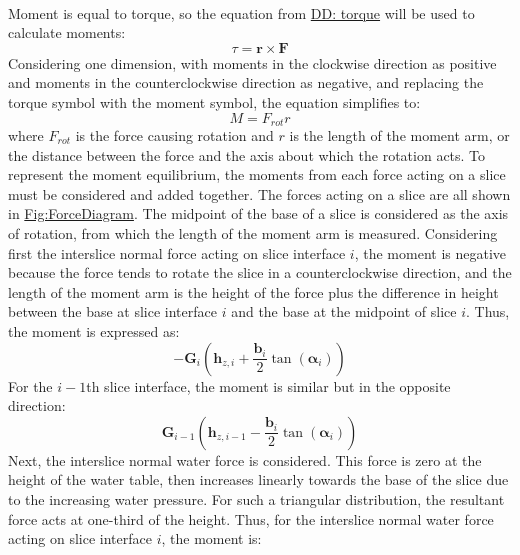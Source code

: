 \documentclass[12pt]{article}
\begin{document}
\paragraph{}
\label{GD:momentEqlDeriv}
Moment is equal to torque, so the equation from \hyperref[DD:torque]{DD: torque} will be used to calculate moments:
\begin{displaymath}
τ=\mathbf{r}\times\mathbf{F}
\end{displaymath}
Considering one dimension, with moments in the clockwise direction as positive and moments in the counterclockwise direction as negative, and replacing the torque symbol with the moment symbol, the equation simplifies to:
\begin{displaymath}
M={F_{rot}} r
\end{displaymath}
where ${F_{rot}}$ is the force causing rotation and $r$ is the length of the moment arm, or the distance between the force and the axis about which the rotation acts. To represent the moment equilibrium, the moments from each force acting on a slice must be considered and added together. The forces acting on a slice are all shown in \hyperref[Figure:ForceDiagram]{Fig:ForceDiagram}. The midpoint of the base of a slice is considered as the axis of rotation, from which the length of the moment arm is measured. Considering first the interslice normal force acting on slice interface $i$, the moment is negative because the force tends to rotate the slice in a counterclockwise direction, and the length of the moment arm is the height of the force plus the difference in height between the base at slice interface $i$ and the base at the midpoint of slice $i$. Thus, the moment is expressed as:
\begin{displaymath}
-{\mathbf{G}}_{i} \left({\mathbf{h}_{z,i}}+\frac{{\mathbf{b}}_{i}}{2} \tan\left({\mathbf{α}}_{i}\right)\right)
\end{displaymath}
For the $i-1$th slice interface, the moment is similar but in the opposite direction:
\begin{displaymath}
{\mathbf{G}}_{i-1} \left({\mathbf{h}_{z,i-1}}-\frac{{\mathbf{b}}_{i}}{2} \tan\left({\mathbf{α}}_{i}\right)\right)
\end{displaymath}
Next, the interslice normal water force is considered. This force is zero at the height of the water table, then increases linearly towards the base of the slice due to the increasing water pressure. For such a triangular distribution, the resultant force acts at one-third of the height. Thus, for the interslice normal water force acting on slice interface $i$, the moment is:
\end{document}
